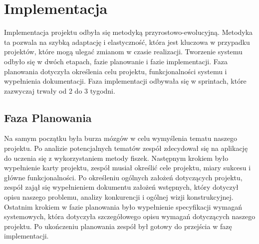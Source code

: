\chapter{Implementacja}

Implementacja projektu odbyła się metodyką przyrostowo-ewolucyjną. Metodyka ta pozwala na szybką adaptację i elastyczność, która jest kluczowa w przypadku projektów, które mogą ulegać zmianom w czasie realizacji. Tworzenie systemu odbyło się w dwóch etapach, fazie planowanie i fazie implementacji. Faza planowania dotyczyła określenia celu projektu, funkcjonalności systemu i wypełnienia dokumentacji. Faza implementacji odbywała się w sprintach, które zazwyczaj trwały od 2 do 3 tygodni.

\section{Faza Planowania}
Na samym początku była burza mózgów w celu wymyślenia tematu naszego projektu. Po analizie potencjalnych tematów zespół zdecydował się na aplikację do uczenia się z wykorzystaniem metody fiszek. Następnym krokiem było wypełnienie karty projektu, zespół musiał określić cele projektu, miary sukcesu i główne funkcjonalności. Po określeniu ogólnych założeń dotyczących projektu, zespół zajął się wypełnieniem dokumentu założeń wstępnych, który dotyczył opisu naszego problemu, analizy konkurencji i ogólnej wizji konstrukcyjnej. Ostatnim krokiem w fazie planowania było wypełnienie specyfikacji wymagań systemowych, która dotyczyła szczegółowego opisu wymagań dotyczących naszego projektu. Po ukończeniu planowania zespół był gotowy do przejścia w fazę implementacji.